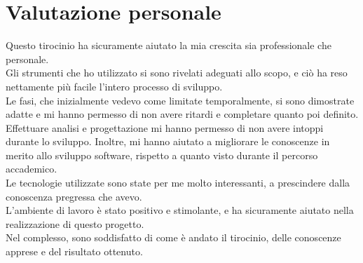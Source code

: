\section{Valutazione personale}
Questo tirocinio ha sicuramente aiutato la mia crescita sia professionale che personale.\\
Gli strumenti che ho utilizzato si sono rivelati adeguati allo scopo, e ciò ha reso nettamente più facile l'intero processo di sviluppo.\\
Le fasi, che inizialmente vedevo come limitate temporalmente, si sono dimostrate adatte e mi hanno permesso di non avere ritardi e completare quanto poi definito.\\
Effettuare analisi e progettazione mi hanno permesso di non avere intoppi durante lo sviluppo. Inoltre, mi hanno aiutato a migliorare le conoscenze in merito allo sviluppo software, rispetto a quanto visto durante il percorso accademico.\\
Le tecnologie utilizzate sono state per me molto interessanti, a prescindere dalla conoscenza pregressa che avevo.\\
L'ambiente di lavoro è stato positivo e stimolante, e ha sicuramente aiutato nella realizzazione di questo progetto.\\
Nel complesso, sono soddisfatto di come è andato il tirocinio, delle conoscenze apprese e del risultato ottenuto. 